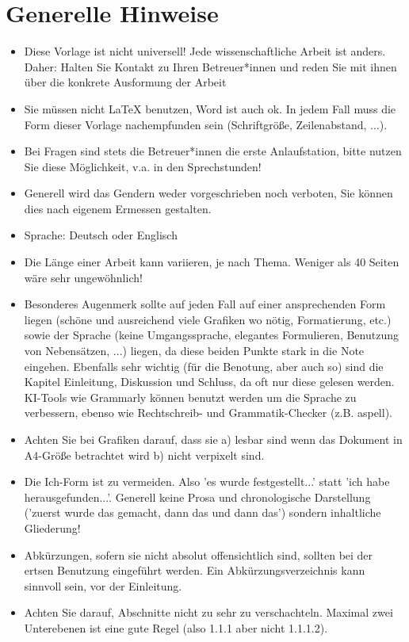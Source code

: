 \documentclass[12pt,oneside]{article}
\begin{document}
\section {Generelle Hinweise}
\begin{itemize}
    \item Diese Vorlage ist nicht universell! Jede wissenschaftliche Arbeit ist anders. Daher: Halten Sie Kontakt zu Ihren Betreuer*innen und reden Sie mit ihnen über die konkrete Ausformung der Arbeit
    \item Sie müssen nicht LaTeX benutzen, Word ist auch ok. In jedem Fall muss die Form dieser Vorlage nachempfunden sein (Schriftgröße, Zeilenabstand, ...).
    \item Bei Fragen sind stets die Betreuer*innen die erste Anlaufstation, bitte nutzen Sie diese Möglichkeit, v.a. in den Sprechstunden!
    \item Generell wird das Gendern weder vorgeschrieben noch verboten, Sie können dies nach eigenem Ermessen gestalten. 
    \item Sprache: Deutsch oder Englisch
     \item Die Länge einer Arbeit kann variieren, je nach Thema. Weniger als 40 Seiten wäre sehr ungewöhnlich!
     \item Besonderes Augenmerk sollte auf jeden Fall auf einer ansprechenden Form liegen (schöne und ausreichend viele Grafiken wo nötig, Formatierung, etc.) sowie der Sprache (keine Umgangssprache, elegantes Formulieren, Benutzung von Nebensätzen, ...) liegen, da diese beiden Punkte stark in die Note eingehen. Ebenfalls sehr wichtig (für die Benotung, aber auch so) sind die Kapitel Einleitung, Diskussion und Schluss, da oft nur diese gelesen werden. KI-Tools wie Grammarly können benutzt werden um die Sprache zu verbessern, ebenso wie Rechtschreib- und Grammatik-Checker (z.B. aspell). 
     \item Achten Sie bei Grafiken darauf, dass sie a) lesbar sind wenn das Dokument in A4-Größe betrachtet wird b) nicht verpixelt sind.
     \item Die Ich-Form ist zu vermeiden. Also 'es wurde festgestellt...' statt 'ich habe herausgefunden...'. Generell keine Prosa und chronologische Darstellung ('zuerst wurde das gemacht, dann das und dann das') sondern inhaltliche Gliederung!
     \item Abkürzungen, sofern sie nicht absolut offensichtlich sind, sollten bei der ertsen Benutzung eingeführt werden. Ein Abkürzungsverzeichnis kann sinnvoll sein, vor der Einleitung.
     \item Achten Sie darauf, Abschnitte nicht zu sehr zu verschachteln. Maximal zwei Unterebenen ist eine gute Regel (also 1.1.1 aber nicht 1.1.1.2). 
\end{itemize}
\end{document}
